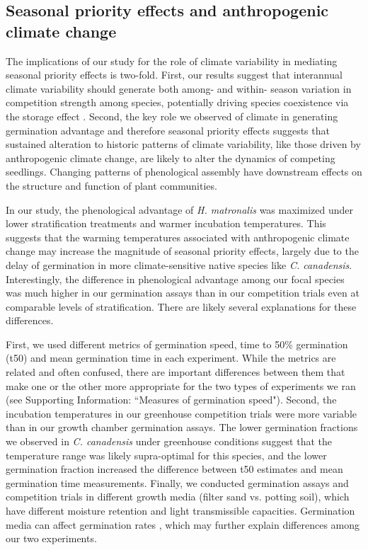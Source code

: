 \documentclass{article}[11pt]
\begin{document}
\subsection*{Seasonal priority effects and anthropogenic climate change}
The implications of our study for the role of climate variability in mediating seasonal priority effects is two-fold. First, our results suggest that interannual climate variability should generate both among- and within- season variation in competition strength among species, potentially driving species coexistence via the storage effect \citep{Chesson:2003ve}. Second, the key role we observed of climate in generating germination advantage and therefore seasonal priority effects suggests that sustained alteration to historic patterns of climate variability, like those driven by anthropogenic climate change, are likely to alter the dynamics of competing seedlings. Changing patterns of phenological assembly have downstream effects on the structure and function of plant communities.

In our study, the phenological advantage of \textit{H. matronalis} was maximized under lower stratification treatments and warmer incubation temperatures. This suggests that the warming temperatures associated with anthropogenic climate change may increase the magnitude of seasonal priority effects, largely due to the delay of germination in more climate-sensitive native species like \textit{C. canadensis}. Interestingly, the difference in phenological advantage among our focal species was much higher in our germination assays than in our competition trials even at comparable levels of stratification. There are likely several explanations for these differences.

First, we used different metrics of germination speed, time to 50\% germination (t50) and mean germination time in each experiment. While the metrics are related and often confused, there are important differences between them that make one or the other more appropriate for the two types of experiments we ran (see Supporting Information: ``Measures of germination speed"). Second, the incubation temperatures in our greenhouse competition trials were more variable than in our growth chamber germination assays. The lower germination fractions we observed in \textit{C. canadensis} under greenhouse conditions suggest that the temperature range was likely supra-optimal for this species, and the lower germination fraction increased the difference between t50 estimates and mean germination time measurements. Finally, we  conducted germination assays and competition trials in different growth media (filter sand vs. potting soil), which have different moisture retention and light transmissible capacities. Germination media can affect germination rates \citep{Baskin2014}, which may further explain differences among our two experiments.
\end{document}
